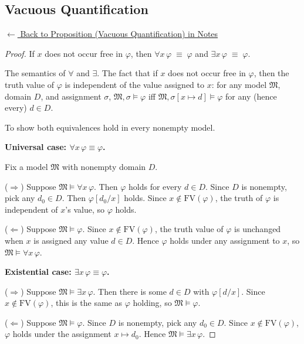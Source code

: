 
\subsection*{Vacuous Quantification}
\label{prf:vacuous}

\begin{remark*}[Return]
\hyperref[thm:vacuous]{$\leftarrow$ Back to Proposition (Vacuous Quantification) in Notes}
\end{remark*}

\begin{proof}
\Claim If $x$ does not occur free in $\varphi$, then $\forall x\,\varphi \;\equiv\; \varphi$ and $\exists x\,\varphi \;\equiv\; \varphi$.

\Given The semantics of $\forall$ and $\exists$. The fact that if $x$ does not
occur free in $\varphi$, then the truth value of $\varphi$ is independent of
the value assigned to $x$: for any model $\mathfrak{M}$, domain $D$, and
assignment $\sigma$, $\mathfrak{M}, \sigma \models \varphi$ iff $\mathfrak{M},
\sigma[x \mapsto d] \models \varphi$ for any (hence every) $d \in D$.

\Goal To show both equivalences hold in every nonempty model.

\medskip
\noindent\textbf{Universal case: $\forall x\,\varphi \equiv \varphi$.}

Fix a model $\mathfrak{M}$ with nonempty domain $D$.

($\Rightarrow$) Suppose $\mathfrak{M} \models \forall x\,\varphi$. Then
$\varphi$ holds for every $d \in D$. Since $D$ is nonempty, pick any $d_0 \in
D$. Then $\varphi[d_0/x]$ holds. Since $x \notin \mathrm{FV}(\varphi)$, the
truth of $\varphi$ is independent of $x$'s value, so $\varphi$ holds.

($\Leftarrow$) Suppose $\mathfrak{M} \models \varphi$. Since $x \notin
\mathrm{FV}(\varphi)$, the truth value of $\varphi$ is unchanged when $x$ is
assigned any value $d \in D$. Hence $\varphi$ holds under any assignment to
$x$, so $\mathfrak{M} \models \forall x\,\varphi$.

\medskip
\noindent\textbf{Existential case: $\exists x\,\varphi \equiv \varphi$.}

($\Rightarrow$) Suppose $\mathfrak{M} \models \exists x\,\varphi$. Then there
is some $d \in D$ with $\varphi[d/x]$. Since $x \notin \mathrm{FV}(\varphi)$,
this is the same as $\varphi$ holding, so $\mathfrak{M} \models \varphi$.

($\Leftarrow$) Suppose $\mathfrak{M} \models \varphi$. Since $D$ is nonempty,
pick any $d_0 \in D$. Since $x \notin \mathrm{FV}(\varphi)$, $\varphi$ holds
under the assignment $x \mapsto d_0$. Hence $\mathfrak{M} \models \exists
x\,\varphi$. \AsReq
\end{proof}

